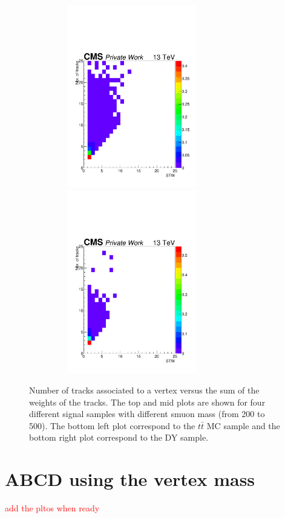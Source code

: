 \documentclass{cernatlasnote}
\begin{document}
\begin{appendices}
\begin{figure}[ht]
\includegraphics[height=8cm, width=9cm, trim= 0cm 0cm 0cm 0cm,clip]{images/VTXBDT/STW_Ntrks_TTTo2L2Nu.pdf}\includegraphics[height=8cm, width=9cm, trim= 0cm 0cm 0cm 0cm,clip]{images/VTXBDT/STW_Ntrks_DYM50.pdf}
\caption{\label{fig:STWvsNtrks} Number of tracks associated to a vertex versus the sum of the weights of the tracks. The top and mid plots are shown for four different signal samples with different smuon mass (from 200 to 500). The bottom left plot correspond to the $t\bar{t}$ MC sample and the bottom right plot correspond to the DY sample.}
\end{figure} 
\FloatBarrier


\section{ABCD using the vertex mass}
\label{APP:ABCDVTXMASS}
\textcolor{red}{add the pltos when ready}


\end{appendices}
\end{document}
